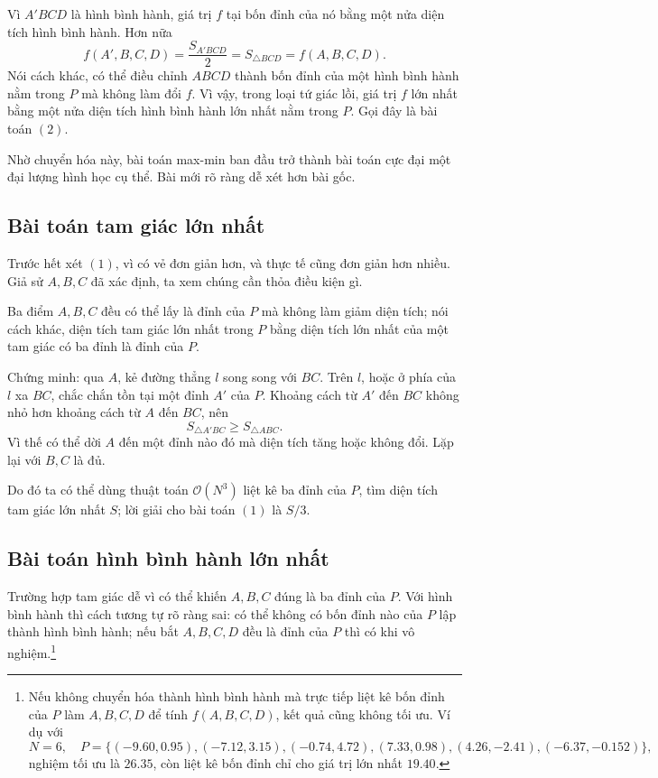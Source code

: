\documentclass[11pt]{article}
\newcommand{\Oh}{\mathcal{O}}
\newcommand{\area}[1]{S_{#1}}
\begin{document}
Vì \(A'BCD\) là hình bình hành, giá trị \(f\) tại bốn đỉnh của nó bằng một nửa
diện tích hình bình hành. Hơn nữa
\[
  f(A',B,C,D)=\frac{\area{A'BCD}}2=\area{\triangle BCD}=f(A,B,C,D).
\]
Nói cách khác, có thể điều chỉnh \(ABCD\) thành bốn đỉnh của một hình bình
hành nằm trong \(P\) mà không làm đổi \(f\). Vì vậy, trong loại tứ giác lồi,
giá trị \(f\) lớn nhất bằng một nửa diện tích hình bình hành lớn nhất nằm trong
\(P\). Gọi đây là bài toán \((2)\).

Nhờ chuyển hóa này, bài toán max-min ban đầu trở thành bài toán cực đại một
đại lượng hình học cụ thể. Bài mới rõ ràng dễ xét hơn bài gốc.

\subsection{Bài toán tam giác lớn nhất}

Trước hết xét \((1)\), vì có vẻ đơn giản hơn, và thực tế cũng đơn giản hơn
nhiều. Giả sử \(A,B,C\) đã xác định, ta xem chúng cần thỏa điều kiện gì.

Ba điểm \(A,B,C\) đều có thể lấy là đỉnh của \(P\) mà không làm giảm diện tích;
nói cách khác, diện tích tam giác lớn nhất trong \(P\) bằng diện tích lớn nhất
của một tam giác có ba đỉnh là đỉnh của \(P\).

Chứng minh: qua \(A\), kẻ đường thẳng \(l\) song song với \(BC\). Trên \(l\),
hoặc ở phía của \(l\) xa \(BC\), chắc chắn tồn tại một đỉnh \(A'\) của \(P\).
Khoảng cách từ \(A'\) đến \(BC\) không nhỏ hơn khoảng cách từ \(A\) đến \(BC\),
nên
\[
  \area{\triangle A'BC}\ge \area{\triangle ABC}.
\]
Vì thế có thể dời \(A\) đến một đỉnh nào đó mà diện tích tăng hoặc không đổi.
Lặp lại với \(B,C\) là đủ.

Do đó ta có thể dùng thuật toán \(\Oh(N^3)\) liệt kê ba đỉnh của \(P\), tìm
diện tích tam giác lớn nhất \(S\); lời giải cho bài toán \((1)\) là \(S/3\).

\subsection{Bài toán hình bình hành lớn nhất}

Trường hợp tam giác dễ vì có thể khiến \(A,B,C\) đúng là ba đỉnh của \(P\).
Với hình bình hành thì cách tương tự rõ ràng sai: có thể không có bốn đỉnh nào
của \(P\) lập thành hình bình hành; nếu bắt \(A,B,C,D\) đều là đỉnh của \(P\)
thì có khi vô nghiệm.\footnote{Nếu không chuyển hóa thành hình bình hành mà
trực tiếp liệt kê bốn đỉnh của \(P\) làm \(A,B,C,D\) để tính \(f(A,B,C,D)\),
kết quả cũng không tối ưu. Ví dụ với
\[
N=6,\quad
P=\{(-9.60,0.95),(-7.12,3.15),(-0.74,4.72),
(7.33,0.98),(4.26,-2.41),(-6.37,-0.152)\},
\]
nghiệm tối ưu là \(26.35\), còn liệt kê bốn đỉnh chỉ cho giá trị lớn nhất
\(19.40\).}
\end{document}
